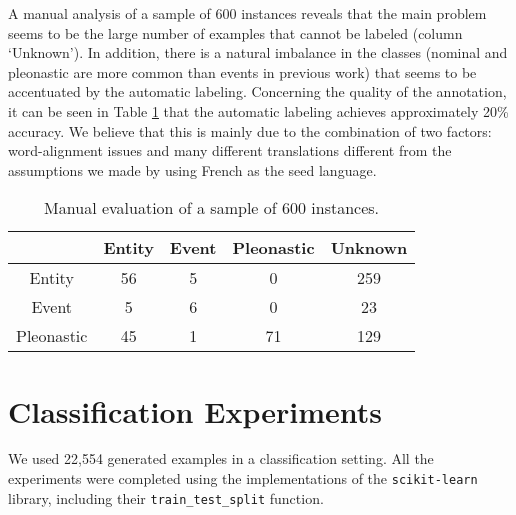 \documentclass[10pt, a4paper]{article}
\begin{document}
A manual analysis of a sample of 600 instances reveals that the main problem 
seems to be the large number of examples that cannot be labeled (column `Unknown'). 
In addition, there is a natural imbalance in the classes (nominal and pleonastic are more
common than events in previous work) that seems to be accentuated by the
automatic labeling. Concerning the quality of the annotation, it can
be seen in Table \ref{tab:manualsample600} that the automatic labeling achieves
approximately 20\% accuracy. We believe that this is mainly due to the
combination of two factors: word-alignment issues and many different
translations different from the assumptions we made by using French as the seed language.  

\begin{table}[h!]\centering 
\begin{tabular}{ccccc} 
\toprule 
&Entity & Event &Pleonastic & Unknown \\ 
\midrule Entity &   56  &  5   &   0     &  259  \\ 
Event &    5  &  6   &  0  &  23\\ 
Pleonastic& 45 & 1&  71&  129\\
\bottomrule 
\end{tabular} \caption{Manual evaluation of a sample of 600
instances.}\label{tab:manualsample600} 
\end{table}




%
%
%
%
\section{Classification Experiments}

We used 22,554 generated examples in a classification setting. All the experiments were completed using the implementations of the \texttt{scikit-learn} library, including their \texttt{train\_test\_split} function. 
\end{document}
